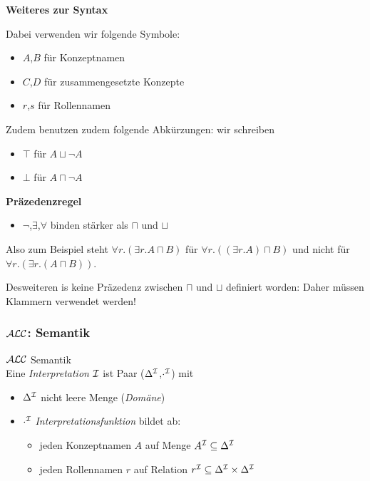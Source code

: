 \textbf{Weiteres zur Syntax}

Dabei verwenden wir folgende Symbole:

\begin{itemize}
  \item{$A$,$B$ für Konzeptnamen}
  \item{$C$,$D$ für zusammengesetzte Konzepte}
  \item{$r$,$s$ für Rollennamen}
\end{itemize}

Zudem benutzen zudem folgende Abkürzungen: wir schreiben

\begin{itemize}
  \item{$\top$ für $A \sqcup \neg A$}
  \item{$\bot$ für $A \sqcap \neg A$}
\end{itemize}

\textbf{Präzedenzregel}

\begin{itemize}
  \item{$\neg$,$\exists$,$\forall$ binden stärker als $\sqcap$ und $\sqcup$}
\end{itemize}

Also zum Beispiel steht $\forall r.(\exists r.A \sqcap B)$ für $\forall r.((\exists r.A) \sqcap B)$ und nicht für $\forall r.(\exists r.(A \sqcap B))$.

Desweiteren is keine Präzedenz zwischen $\sqcap$ und $\sqcup$ definiert worden: Daher müssen Klammern verwendet werden!

\subsubsection{\texorpdfstring{$\mathcal{A}\mathcal{L}\mathcal{C}$}{ALC}: Semantik}

\begin{definition}{$\mathcal{A}\mathcal{L}\mathcal{C}$ Semantik} \\
Eine \emph{Interpretation} $\mathcal{I}$ ist Paar ($\Delta^{\mathcal{I}}$,$\cdot^{\mathcal{I}}$) mit
  \begin{itemize}
    \item{$\Delta^{\mathcal{I}}$ nicht leere Menge (\emph{Domäne})}
    \item{$\cdot^{\mathcal{I}}$ \emph{Interpretationsfunktion} bildet ab:
     \begin{itemize}
       \item{jeden Konzeptnamen $A$ auf Menge $A^{\mathcal{I}} \subseteq \Delta^{\mathcal{I}}$}
       \item{jeden Rollennamen $r$ auf Relation $r^{\mathcal{I}} \subseteq \Delta^{\mathcal{I}} \times \Delta^{\mathcal{I}}$}
     \end{itemize}}
  \end{itemize}
\end{definition}

